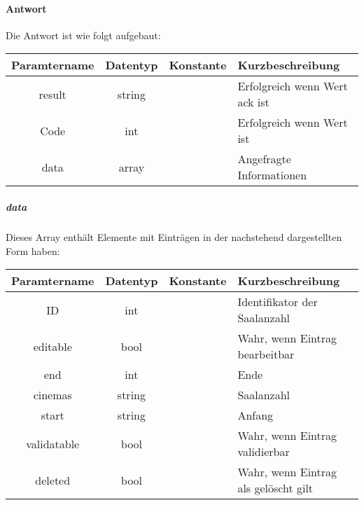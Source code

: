 \paragraph{Antwort}Die Antwort ist wie folgt aufgebaut:
\begin{table}[H]
	\begin{tabular}{|c|c|c|p{6.5cm}|}
		\hline
		\textbf{Paramtername} & \textbf{Datentyp} & \textbf{Konstante} & \textbf{Kurzbeschreibung}                                                                                               \\ \hline
		result              & string           &                 & Erfolgreich wenn Wert {\glqq ack\grqq} ist \\ \hline
		Code                & int              &                 & Erfolgreich wenn Wert {\glqq 0\grqq} ist \\ \hline
		data                & array            &                 & Angefragte Informationen \\ \hline
	\end{tabular}
\end{table}
\subparagraph{data}Dieses Array enthält Elemente mit Einträgen in der nachstehend dargestellten Form haben:
\begin{table}[H]
	\begin{tabular}{|c|c|c|p{6.5cm}|}
		\hline
		\textbf{Paramtername} & \textbf{Datentyp} & \textbf{Konstante} & \textbf{Kurzbeschreibung}    \\ \hline
		ID                     & int             &                 & Identifikator der Saalanzahl \\ \hline
		editable               & bool            &                 & Wahr, wenn Eintrag bearbeitbar \\ \hline
		end                    & int             &                 & Ende \\ \hline
		cinemas                & string          &                 & Saalanzahl \\ \hline
		start                  & string          &                 & Anfang \\ \hline
		validatable            & bool            &                 & Wahr, wenn Eintrag validierbar \\ \hline
		deleted                & bool            &                 & Wahr, wenn Eintrag als gelöscht gilt \\ \hline
	\end{tabular}
\end{table}

